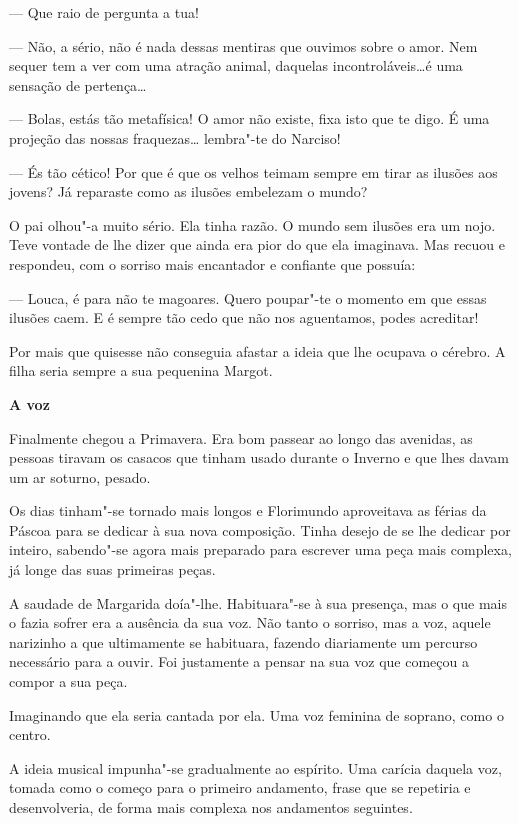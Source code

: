 --- Que raio de pergunta a tua!

--- Não, a sério, não é nada dessas mentiras que ouvimos sobre o amor. Nem
sequer tem a ver com uma atração animal, daquelas incontroláveis\ldots{}é
uma sensação de pertença\ldots{}

--- Bolas, estás tão metafísica! O amor não existe, fixa isto que te digo.
É uma projeção das nossas fraquezas\ldots{} lembra"-te do Narciso!

--- És tão cético! Por que é que os velhos teimam sempre em tirar as
ilusões aos jovens? Já reparaste como as ilusões embelezam o mundo?

O pai olhou"-a muito sério. Ela tinha razão. O mundo sem ilusões era
um nojo. Teve vontade de lhe dizer que ainda era pior do que ela
imaginava. Mas recuou e respondeu, com o sorriso mais encantador e
confiante que possuía:

--- Louca, é para não te magoares. Quero poupar"-te o momento em que essas
ilusões caem. E é sempre tão cedo que não nos aguentamos, podes
acreditar!

Por mais que quisesse não conseguia afastar a ideia que lhe ocupava o
cérebro. A filha seria sempre a sua pequenina Margot.

\pagebreak

\vspace*{1.8cm}
\noindent{}\textbf{A voz}

\bigskip

Finalmente chegou a Primavera. Era bom passear ao longo das avenidas, as
pessoas tiravam os casacos que tinham usado durante o Inverno e que lhes
davam um ar soturno, pesado.

Os dias tinham"-se tornado mais longos e Florimundo aproveitava as férias
da Páscoa para se dedicar à sua nova composição. Tinha desejo de se lhe
dedicar por inteiro, sabendo"-se agora mais preparado para escrever uma
peça mais complexa, já longe das suas primeiras peças.

A saudade de Margarida doía"-lhe. Habituara"-se à sua presença, mas o que
mais o fazia sofrer era a ausência da sua voz. Não tanto o sorriso, mas
a voz, aquele narizinho a que ultimamente se habituara, fazendo
diariamente um percurso necessário para a ouvir. Foi justamente a pensar
na sua voz que começou a compor a sua peça.

Imaginando que ela seria cantada por ela. Uma voz feminina de soprano,
como o centro.

A ideia musical impunha"-se gradualmente ao espírito. Uma carícia daquela
voz, tomada como o começo para o primeiro andamento, frase que se
repetiria e desenvolveria, de forma mais complexa nos andamentos
seguintes.

